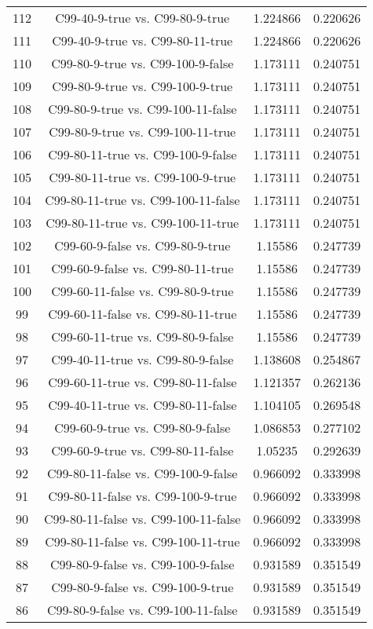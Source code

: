 \documentclass[a4paper,10pt]{article}
\begin{document}
\begin{landscape}
\begin{table}[!htp]
\begin{tabular}{cccc}
112&C99-40-9-true vs. C99-80-9-true&1.224866&0.220626\\
111&C99-40-9-true vs. C99-80-11-true&1.224866&0.220626\\
110&C99-80-9-true vs. C99-100-9-false&1.173111&0.240751\\
109&C99-80-9-true vs. C99-100-9-true&1.173111&0.240751\\
108&C99-80-9-true vs. C99-100-11-false&1.173111&0.240751\\
107&C99-80-9-true vs. C99-100-11-true&1.173111&0.240751\\
106&C99-80-11-true vs. C99-100-9-false&1.173111&0.240751\\
105&C99-80-11-true vs. C99-100-9-true&1.173111&0.240751\\
104&C99-80-11-true vs. C99-100-11-false&1.173111&0.240751\\
103&C99-80-11-true vs. C99-100-11-true&1.173111&0.240751\\
102&C99-60-9-false vs. C99-80-9-true&1.15586&0.247739\\
101&C99-60-9-false vs. C99-80-11-true&1.15586&0.247739\\
100&C99-60-11-false vs. C99-80-9-true&1.15586&0.247739\\
99&C99-60-11-false vs. C99-80-11-true&1.15586&0.247739\\
98&C99-60-11-true vs. C99-80-9-false&1.15586&0.247739\\
97&C99-40-11-true vs. C99-80-9-false&1.138608&0.254867\\
96&C99-60-11-true vs. C99-80-11-false&1.121357&0.262136\\
95&C99-40-11-true vs. C99-80-11-false&1.104105&0.269548\\
94&C99-60-9-true vs. C99-80-9-false&1.086853&0.277102\\
93&C99-60-9-true vs. C99-80-11-false&1.05235&0.292639\\
92&C99-80-11-false vs. C99-100-9-false&0.966092&0.333998\\
91&C99-80-11-false vs. C99-100-9-true&0.966092&0.333998\\
90&C99-80-11-false vs. C99-100-11-false&0.966092&0.333998\\
89&C99-80-11-false vs. C99-100-11-true&0.966092&0.333998\\
88&C99-80-9-false vs. C99-100-9-false&0.931589&0.351549\\
87&C99-80-9-false vs. C99-100-9-true&0.931589&0.351549\\
86&C99-80-9-false vs. C99-100-11-false&0.931589&0.351549\\

\end{tabular}
\end{table}
\end{landscape}
\end{document}
